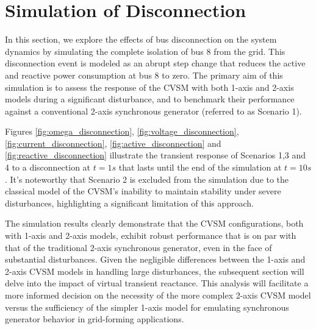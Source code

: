 \section{Simulation of Disconnection}\label{sec:disconnection}

In this section, we explore the effects of bus disconnection on the system
dynamics by simulating the complete isolation of bus 8 from the grid. This
disconnection event is modeled as an abrupt step change that reduces the active
and reactive power consumption at bus 8 to zero. The primary aim of this
simulation is to assess the response of the CVSM with both 1-axis and 2-axis
models during a significant disturbance, and to benchmark their performance
against a conventional 2-axis synchronous generator (referred to as Scenario 1).

Figures \ref{fig:omega_disconnection}, \ref{fig:voltage_disconnection},
\ref{fig:current_disconnection}, \ref{fig:active_disconnection} and
\ref{fig:reactive_disconnection} illustrate the transient response of Scenarios
1,3 and 4 to a disconnection at $t=1s$ that lasts until the end of the simulation
at $t=10s$. It's noteworthy that Scenario 2 is excluded from the simulation due
to the classical model of the CVSM's inability to maintain stability under
severe disturbances, highlighting a significant limitation of this approach.

The simulation results clearly demonstrate that the CVSM configurations, both
with 1-axis and 2-axis models, exhibit robust performance that is on par with
that of the traditional 2-axis synchronous generator, even in the face of
substantial disturbances. Given the negligible differences between the 1-axis
and 2-axis CVSM models in handling large disturbances, the subsequent section
will delve into the impact of virtual transient reactance. This analysis will
facilitate a more informed decision on the necessity of the more complex 2-axis
CVSM model versus the sufficiency of the simpler 1-axis model for emulating
synchronous generator behavior in grid-forming applications.


